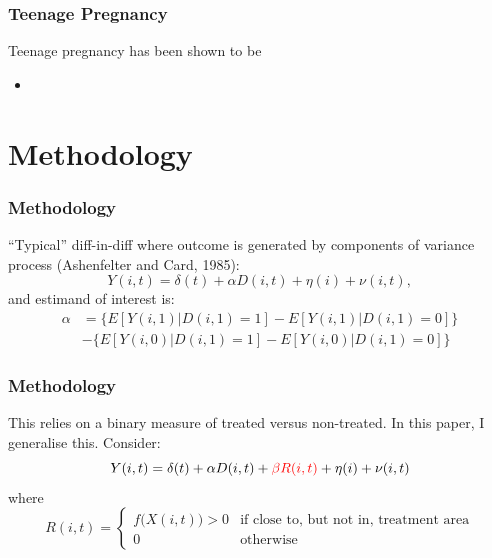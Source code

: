 \documentclass[10pt,letterpaper,subeqn]{beamer}
\begin{document}
\begin{frame}[label=teenPreg2]
  \frametitle{Teenage Pregnancy}
Teenage pregnancy has been shown to be 
\vspace{4mm}
\begin{itemize}
\item 
\end{itemize}
\end{frame}


\section{Methodology}
\begin{frame}[label=method1]
  \frametitle{Methodology}
``Typical'' diff-in-diff where outcome is generated by components of variance 
process (Ashenfelter and Card, 1985):
\vspace{4mm}
\begin{equation}
\label{Seqn:COV}
Y(i,t)=\delta(t) + \alpha D(i,t)+\eta(i)+\nu(i,t),
\end{equation}
\vspace{4mm}
and estimand of interest is:
\vspace{4mm}
\begin{eqnarray}
\label{Seqn:DD}
\alpha&=\{E[Y(i,1)|D(i,1)=1]-E[Y(i,1)|D(i,1)=0]\} \\ \nonumber
      &-\{E[Y(i,0)|D(i,1)=1]-E[Y(i,0)|D(i,1)=0]\}
\end{eqnarray}
\end{frame}

\begin{frame}[label=method2]
  \frametitle{Methodology}
This relies on a binary measure of treated versus non-treated.  In this paper,
I generalise this.  Consider:
\vspace{5mm}
\begin{equation}
\label{Seqn:COV2}
Y(i,t)=\delta(t) + \alpha D(i,t)+\textcolor{red}{\beta R(i,t)}+\eta(i)+\nu(i,t)
\end{equation}
\vspace{3mm}
where
\vspace{3mm}
\[
 R(i,t) =
  \begin{cases}
   f\Big(X(i,t)\Big)>0   & \text{if close to, but not in, treatment area} \\ 
   0                            & \text{otherwise} 
  \end{cases}
\]

\end{frame}
\end{document}
